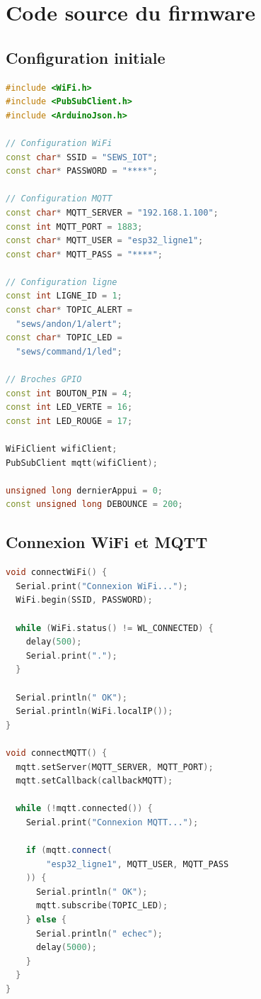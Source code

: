 \section{Code source du firmware}

\subsection{Configuration initiale}

\begin{lstlisting}[language=C++,
caption={Configuration et constantes},
label={lst:config_esp32}]
#include <WiFi.h>
#include <PubSubClient.h>
#include <ArduinoJson.h>

// Configuration WiFi
const char* SSID = "SEWS_IOT";
const char* PASSWORD = "****";

// Configuration MQTT
const char* MQTT_SERVER = "192.168.1.100";
const int MQTT_PORT = 1883;
const char* MQTT_USER = "esp32_ligne1";
const char* MQTT_PASS = "****";

// Configuration ligne
const int LIGNE_ID = 1;
const char* TOPIC_ALERT = 
  "sews/andon/1/alert";
const char* TOPIC_LED = 
  "sews/command/1/led";

// Broches GPIO
const int BOUTON_PIN = 4;
const int LED_VERTE = 16;
const int LED_ROUGE = 17;

WiFiClient wifiClient;
PubSubClient mqtt(wifiClient);

unsigned long dernierAppui = 0;
const unsigned long DEBOUNCE = 200;
\end{lstlisting}

\subsection{Connexion WiFi et MQTT}

\begin{lstlisting}[language=C++,
caption={Connexion WiFi et MQTT},
label={lst:connect_esp32}]
void connectWiFi() {
  Serial.print("Connexion WiFi...");
  WiFi.begin(SSID, PASSWORD);
  
  while (WiFi.status() != WL_CONNECTED) {
    delay(500);
    Serial.print(".");
  }
  
  Serial.println(" OK");
  Serial.println(WiFi.localIP());
}

void connectMQTT() {
  mqtt.setServer(MQTT_SERVER, MQTT_PORT);
  mqtt.setCallback(callbackMQTT);
  
  while (!mqtt.connected()) {
    Serial.print("Connexion MQTT...");
    
    if (mqtt.connect(
        "esp32_ligne1", MQTT_USER, MQTT_PASS
    )) {
      Serial.println(" OK");
      mqtt.subscribe(TOPIC_LED);
    } else {
      Serial.println(" echec");
      delay(5000);
    }
  }
}
\end{lstlisting}

